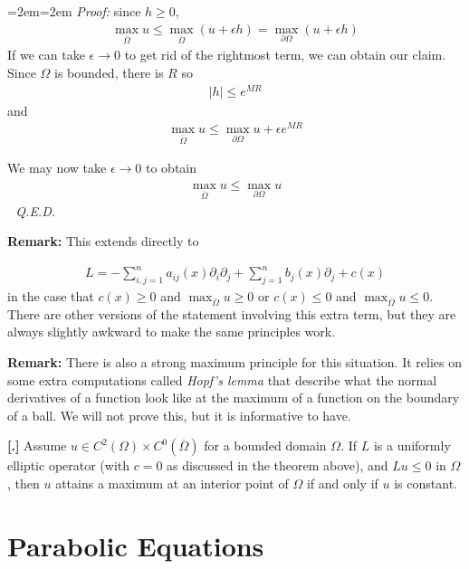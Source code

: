 \documentclass{article}
\newcommand{\cl}[1]{{\overline{#1}}}
\newcommand{\pd}{\partial}
\newcounter{result}[section]
\newenvironment{res}[1][]{\refstepcounter{result}\par\medskip
	\noindent \textbf{[\thesection.\theresult] #1} \rmfamily}{\medskip}
\newenvironment{pf}{%
	\par%
	\medskip
	\leftskip=2em\rightskip=2em%
	\noindent\ignorespaces \textit{Proof:} \newline}{%
	\,\, \newline \textit{Q.E.D.}\par\medskip}
\begin{document}
\begin{pf}
		since $h \geq 0$, 
		\begin{align*}
			\max_{\cl{\Omega}} u \leq \max_{\cl{\Omega}} (u+\epsilon h) =  \max_{\pd \Omega} (u+\epsilon h) 
		\end{align*}
		If we can take $\epsilon \to 0$ to get rid of the rightmost term, we can obtain our claim. Since $\Omega$ is bounded, there is $R$ so 
		\begin{align*}
			|h| \leq e^{MR}
		\end{align*}
		and 
		\begin{align*}
			\max_{\cl{\Omega}} u \leq \max_{\pd \Omega} u + \epsilon e^{MR}
		\end{align*}
		
		We may now take $\epsilon \to 0$ to obtain 
		\begin{align*}
			\max_{\cl{\Omega}} u \leq \max_{\pd \Omega} u 
		\end{align*}
	\end{pf}
	
	\textbf{Remark:}  This extends directly to 
	
	\begin{align*}
		L = -\sum_{i,j =1}^{n} a_{ij}(x) \pd_{i}\pd_{j} + \sum_{j=1}^{n} b_{j}(x) \pd_{j} + c(x)
	\end{align*}
	in the case that $c(x) \geq 0$ and $\max_{\cl{\Omega}} u \geq 0$ or $c(x) \leq 0$ and $\max_{\cl{\Omega}} u \leq 0$. There are other versions of the statement involving this extra term, but they are always slightly awkward to make the same principles work. 
	
	
	\textbf{Remark:} There is also a strong maximum principle for this situation. It relies on some extra computations called \textit{Hopf's lemma} that describe what the normal derivatives of a function look like at the maximum of a function on the boundary of a ball. We will not prove this, but it is informative to have. 
	
	\begin{res}
		Assume $u \in C^{2}(\Omega) \times C^{0}( \cl{\Omega})$ for a bounded domain $\Omega$. If $L$ is a uniformly elliptic operator (with $c=0$ as discussed in the theorem above), and $Lu \leq 0$ in $\Omega$, then $u$ attains a maximum at an interior point of $\Omega$ if and only if $u$ is constant. 
	\end{res}
	
	\section{Parabolic Equations}
	
\end{document}
